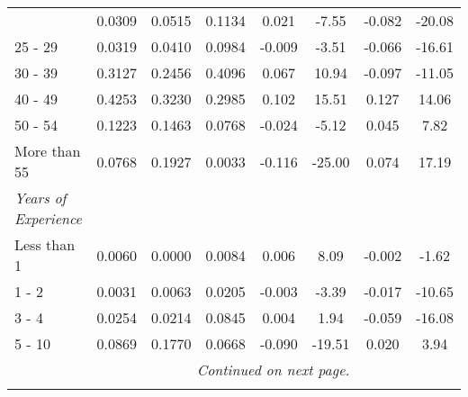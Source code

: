 \documentclass[a4paper, 12pt]{article}
\newcommand{\sym}[1]{\rlap{#1}}%
\begin{document}
\begin{longtable}{@{\extracolsep{1pt}}l*{7}{c}@{}}
\begin{adjustbox}{scale=0.9}
\begin{tabular}{l*{1}{ccccccc}}
Up to 24    &      0.0309&      0.0515&      0.1134&      0.021\sym{***}&       -7.55&      -0.082\sym{***}&      -20.08\\
25 - 29     &      0.0319&      0.0410&      0.0984&      -0.009\sym{***}&       -3.51&      -0.066\sym{***}&      -16.61\\
30 - 39     &      0.3127&      0.2456&      0.4096&      0.067\sym{***}&       10.94&      -0.097\sym{***}&      -11.05\\
40 - 49     &      0.4253&      0.3230&      0.2985&       0.102\sym{***}&       15.51&       0.127\sym{***}&       14.06\\
50 - 54     &      0.1223&      0.1463&      0.0768&       -0.024\sym{***}&       -5.12&       0.045\sym{***}&        7.82\\
More than 55&      0.0768&      0.1927&      0.0033&       -0.116\sym{***}&      -25.00&       0.074\sym{***}&       17.19\\
\emph{Years of Experience}&            &            &            &                     &            &                     &            \\
Less than 1 &      0.0060&      0.0000&      0.0084&      0.006\sym{***}&        8.09&      -0.002         &       -1.62\\
1 - 2       &      0.0031&      0.0063&      0.0205&      -0.003\sym{***}&       -3.39&      -0.017\sym{***}&      -10.65\\
3 - 4       &      0.0254&      0.0214&      0.0845&      0.004\sym{*}  &        1.94&      -0.059\sym{***}&      -16.08\\
5 - 10      &      0.0869&      0.1770&      0.0668&       -0.090\sym{***}&      -19.51&       0.020\sym{***}&        3.94\\
\bottomrule
\multicolumn{6}{r}{\textit{Continued on next page.}} \\
\end{tabular}
\end{adjustbox}
\end{longtable}
\end{document}
